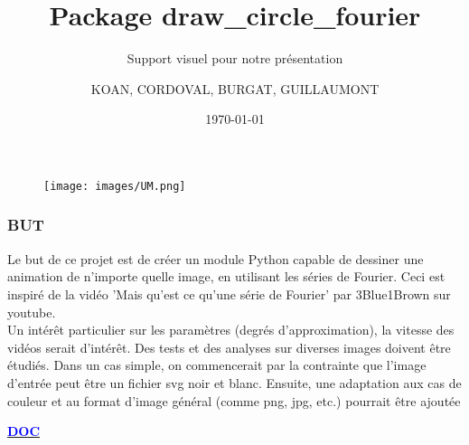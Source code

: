 \documentclass[aspectratio=169]{beamer}
\author{KOAN, CORDOVAL, BURGAT, GUILLAUMONT }
\title[Présentation du Projet de Développement Logiciel]{Package draw\_circle\_fourier}%
\subtitle{Support visuel pour notre présentation}
\institute{Université de Montpellier}
\date{\today}%
\begin{document}
\begin{frame}
    \titlepage
    \vspace{-10pt}
    \begin{figure}[htpb]
        \begin{center}
            \texttt{[image: images/UM.png]}
        \end{center}
    \end{figure}
\end{frame}


\begin{frame}
\frametitle{BUT }

Le but de ce projet est de créer un module Python capable de dessiner une animation de n'importe quelle image, en utilisant les séries de Fourier. Ceci est inspiré de la vidéo 'Mais qu'est ce qu'une série de Fourier' par 3Blue1Brown sur youtube.
\\


Un intérêt particulier sur les paramètres (degrés d'approximation), la vitesse des vidéos serait d'intérêt. Des tests et des analyses sur diverses images doivent être étudiés. Dans un cas simple, on commencerait par la contrainte que l'image d'entrée peut être un fichier svg noir et blanc. Ensuite, une adaptation aux cas de couleur et au format d'image général (comme png, jpg, etc.) pourrait être ajoutée


\href{https://draw-fourier-circle.readthedocs.io/en/latest/fourier/gallery/examples.html}{\textcolor{blue}{\textbf{DOC}}}


\end{frame}
\end{document}
